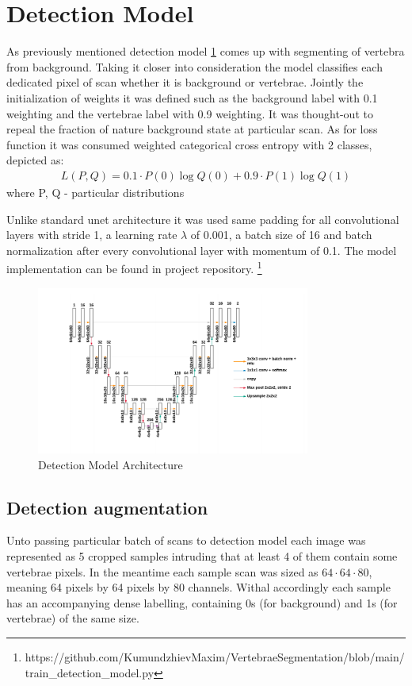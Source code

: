 \section{Detection Model}
As previously mentioned detection model \ref{fig:detection_model} comes up with segmenting of vertebra from background. Taking it closer into consideration the model classifies each dedicated pixel of scan whether it is background or vertebrae. Jointly the initialization of weights it was  defined such as the background label with 0.1 weighting and the vertebrae label with 0.9 weighting. It was thought-out to repeal the fraction of nature background state at particular scan. As for loss function it was consumed \cite{Zhang2018} weighted categorical cross entropy with 2 classes, depicted as:
\begin{align*}
 L(P, Q) = 0.1 \cdot P(0)\log Q(0) + 0.9 \cdot P(1)\log Q(1)
\end{align*}
where P, Q - particular distributions 

Unlike standard unet architecture it was used same padding for all convolutional layers with stride 1, a learning rate
$\lambda$ of 0.001, a batch size of 16 and batch normalization after every convolutional layer with momentum of 0.1. The model implementation can be found in project repository.
\footnote{https://github.com/KumundzhievMaxim/VertebraeSegmentation/blob/main/train_detection_model.py}

\begin{figure}[h]
    \centering \includegraphics[width=9cm]{images/detection_model.png}
    \caption {Detection Model Architecture}
    \label{fig:detection_model}
\end{figure}
 
\subsection{Detection augmentation}
Unto passing particular batch of scans to detection model each image was represented as 5 cropped samples intruding that at least 4 of them contain some vertebrae pixels. In the meantime each sample scan was sized as $64 \cdot 64 \cdot 80$, meaning 64 pixels by 64 pixels by 80 channels. Withal accordingly each sample has an accompanying dense labelling, containing 0s (for background) and 1s (for vertebrae) of the same size.    
 
